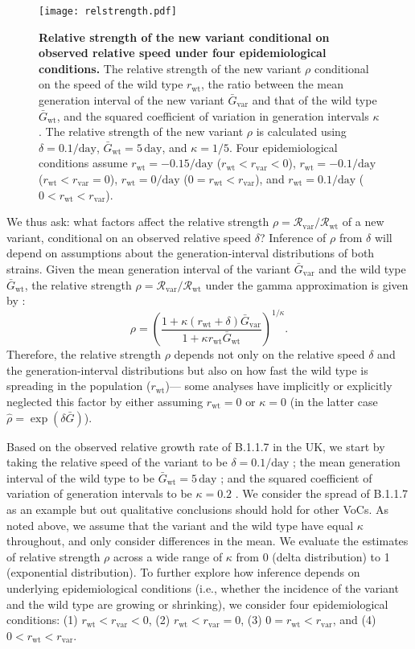 \documentclass[12pt]{article}
\newcommand{\vvvar}{\mathrm{var}}
\newcommand{\wwwt}{\mathrm{wt}}
\newcommand{\rx}[1]{\ensuremath{{r}_{#1}}\xspace}
\newcommand{\rw}{\rx{\wwwt}}
\newcommand{\rv}{\rx{\vvvar}}
\newcommand{\Rx}[1]{\ensuremath{{\mathcal R}_{#1}}\xspace}
\newcommand{\Rw}{\Rx{\wwwt}}
\newcommand{\Rv}{\Rx{\vvvar}}
\newcommand{\days}{\ensuremath{\, \textrm{day}}}
\newcommand{\pday}{\ensuremath{/\textrm{day}}}
\newcommand{\Gx}[1]{\ensuremath{{\bar G}_{#1}}\xspace}
\newcommand{\Gw}{\Gx{\wwwt}}
\newcommand{\Gv}{\Gx{\vvvar}}
\begin{document}
\begin{figure}[!th]
\texttt{[image: relstrength.pdf]}
\caption{
\textbf{Relative strength of the new variant conditional on observed relative speed under four epidemiological conditions.}
The relative strength of the new variant $\rho$ conditional on the speed of the wild type $\rw$, the ratio between the mean generation interval of the new variant $\Gv$ and that of the wild type $\Gw$, and the squared coefficient of variation in generation intervals $\kappa$.
The relative strength of the new variant $\rho$ is calculated using $\delta=0.1\pday$, $\Gw = 5\days$, and $\kappa = 1/5$.
Four epidemiological conditions assume $\rw=-0.15\pday$ ($\rw < \rv < 0$), $\rw=-0.1\pday$ ($\rw < \rv = 0$), $\rw=0\pday$ ($0 = \rw < \rv$), and $\rw=0.1\pday$ ($0 < \rw < \rv$).
}
\label{fig:relstrength}
\end{figure}

We thus ask: what factors affect the relative strength $\rho = \Rv/\Rw$ of a new variant, conditional on an observed relative speed $\delta$?
Inference of $\rho$ from $\delta$ will depend on assumptions about the generation-interval distributions of both strains.
Given the mean generation interval of the variant $\Gv$ and the wild type $\Gw$, the relative strength $\rho = \Rv/\Rw$ under the gamma approximation is given by \citep{park2019practical}:
\begin{equation}
\rho = \left(\frac{1 + \kappa (\rw + \delta) \Gv}{1 + \kappa \rw \Gw}\right)^{1/\kappa}.
\end{equation}
Therefore, the relative strength $\rho$ depends not only on the relative speed $\delta$ and the generation-interval distributions but also on how fast the wild type is spreading in the population (\rw)---
some analyses have implicitly or explicitly neglected this factor by either assuming $\rw = 0$ \citep{switzerland2021variant} or $\kappa = 0$ \citep{davies2021estimated} (in the latter case $\hat{\rho} = \exp(\delta \bar{G})$).

Based on the observed relative growth rate of B.1.1.7 in the UK, we start by  taking the relative speed of the variant to be $\delta = 0.1/\textrm{day}$  \citep{davies2021estimated}; the mean generation interval of the wild type to be $\Gw = 5\days$ \citep{ferretti2020quantifying}; and the squared coefficient of variation of generation intervals to be $\kappa=0.2$ \citep{ferretti2020quantifying}.
We consider the spread of B.1.1.7 as an example but out qualitative conclusions should hold for other VoCs.
As noted above, we assume that the variant and the wild type have equal $\kappa$ throughout, and only consider differences in the mean.
We evaluate the estimates of relative strength $\rho$ across a wide range of $\kappa$ from 0 (delta distribution) to 1 (exponential distribution).
To further explore how inference depends on underlying epidemiological conditions (i.e., whether the incidence of the variant and the wild type are growing or shrinking), we consider four epidemiological conditions: (1) $\rw < \rv < 0$, (2) $\rw < \rv = 0$, (3) $0 = \rw < \rv$, and (4) $0 < \rw < \rv$.
\end{document}
